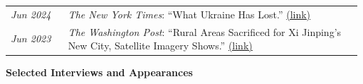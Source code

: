 \documentclass[letterpaper,11pt,oneside]{article}
\newcommand{\datefmt}[1]{\textit{#1}}
\begin{document}
\begin{longtable}{@{}p{0.16\linewidth}p{0.82\linewidth}@{}}
\datefmt{Jun 2024} & \textit{The New York Times}: “What Ukraine Has Lost.” \href{https://www.nytimes.com/interactive/2024/06/03/world/europe/ukraine-destruction.html}{(link)}\\[1.0ex]

\datefmt{Jun 2023} & \textit{The Washington Post}: “Rural Areas Sacrificed for Xi Jinping’s New City, Satellite Imagery Shows.” \href{https://www.washingtonpost.com/world/2023/08/31/china-floods-beijing-rain/}{(link)}\\[1.0ex]

\end{longtable}
\vspace{-4ex}

\begin{flushleft}\textbf{Selected Interviews and Appearances}\end{flushleft}
\vspace{-4ex}
\end{document}
